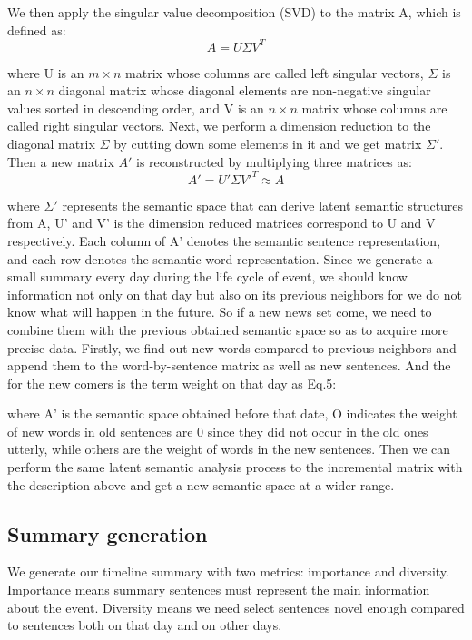 \documentclass[runningheads,a4paper]{llncs}
\begin{document}
We then apply the singular value decomposition (SVD) to the matrix A, which is defined as:
\begin{equation}
A = U \Sigma V^T
\end{equation}

where U is an $m×n$ matrix whose columns are called left singular vectors, $\Sigma$ is an $n×n$ diagonal matrix whose diagonal elements are non-negative singular values sorted in descending order, and V is an $n×n$ matrix whose columns are called right singular vectors.
Next, we perform a dimension reduction to the diagonal matrix $\Sigma$ by cutting down some elements in it and we get matrix $\Sigma '$. Then a new matrix $A'$ is reconstructed by multiplying three matrices as:
\begin{equation}
A' = U' \Sigma V'^T \approx A
\end{equation}
 

where $\Sigma'$ represents the semantic space that can derive latent semantic structures from A, U' and V' is the dimension reduced matrices correspond to U and V respectively. Each column of A' denotes the semantic sentence representation, and each row denotes the semantic word representation.
Since we generate a small summary every day during the life cycle of event, we should know information not only on that day but also on its previous neighbors for we do not know what will happen in the future. So if a new news set come, we need to combine them with the previous obtained semantic space so as to acquire more precise data. Firstly, we find out new words compared to previous neighbors and append them to the word-by-sentence matrix as well as new sentences. And the   for the new comers is the term weight on that day as Eq.5: 
 
where A' is the semantic space obtained before that date, O indicates the weight of new words in old sentences are 0 since they did not occur in the old ones utterly, while others are the weight of words in the new sentences.  
Then we can perform the same latent semantic analysis process to the incremental matrix with the description above and get a new semantic space at a wider range.

\subsection{Summary generation}
We generate our timeline summary with two metrics: importance and diversity. Importance means summary sentences must represent the main information about the event. Diversity means we need select sentences novel enough compared to sentences both on that day and on other days.
\end{document}
